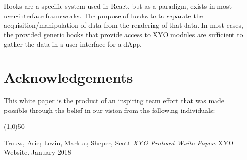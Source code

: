 \documentclass{article}
\begin{document}
Hooks are a specific system used in React, but as a paradigm, exists in most user-interface frameworks.  The purpose of hooks to to separate the acquisition/manipulation of data from the rendering of that data.  In most cases, the provided generic hooks that provide access to XYO modules are sufficient to gather the data in a user interface for a dApp.


\section {Acknowledgements}
This white paper is the product of an inspiring team effort that was made possible through the belief in our vision from the following individuals:

\begin{center}
    \line(1,0){50}
\end{center}



\begin{thebibliography}{9}

    Trouw, Arie; Levin, Markus; Sheper, Scott
    \textit{XYO Protocol White Paper}.
    XYO Website. January 2018

\end{thebibliography}

\clearpage

\printglossaries

\end{document}
